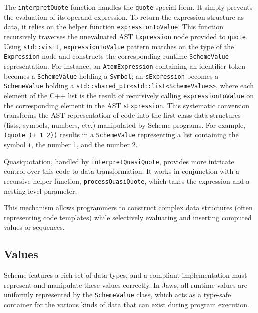 \documentclass[final]{cmpreport_02}
\begin{document}
The \texttt{interpretQuote} function handles the \texttt{quote} special form. It simply prevents the evaluation of its operand expression. To return the expression structure as data, it relies on the helper function \texttt{expressionToValue}. This function recursively traverses the unevaluated AST \texttt{Expression} node provided to \texttt{quote}. Using \texttt{std::visit}, \texttt{expressionToValue} pattern matches on the type of the \texttt{Expression} node and constructs the corresponding runtime \texttt{SchemeValue} representation. For instance, an \texttt{AtomExpression} containing an identifier token becomes a \texttt{SchemeValue} holding a \texttt{Symbol}; an \texttt{sExpression} becomes a \texttt{SchemeValue} holding a \texttt{std::shared\_ptr<std::list<SchemeValue>>}, where each element of the C++ list is the result of recursively calling \texttt{expressionToValue} on the corresponding element in the AST \texttt{sExpression}. This systematic conversion transforms the AST representation of code into the first-class data structures (lists, symbols, numbers, etc.) manipulated by Scheme programs. For example, \texttt{(quote (+ 1 2))} results in a \texttt{SchemeValue} representing a list containing the symbol \texttt{+}, the number 1, and the number 2.

Quasiquotation, handled by \texttt{interpretQuasiQuote}, provides more intricate control over this code-to-data transformation. It works in conjunction with a recursive helper function, \texttt{processQuasiQuote}, which takes the expression and a nesting level parameter.

This mechanism allows programmers to construct complex data structures (often representing code templates) while selectively evaluating and inserting computed values or sequences.


\subsection{Values}

Scheme features a rich set of data types, and a compliant implementation must represent and manipulate these values correctly. In Jaws, all runtime values are uniformly represented by the \texttt{SchemeValue} class, which acts as a type-safe container for the various kinds of data that can exist during program execution.
\end{document}
